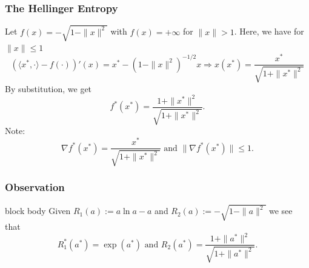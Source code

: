 \documentclass[aspectratio=169,xcolor=dvipsnames,11pt]{beamer}
\begin{document}
\begin{frame}\frametitle{The Hellinger Entropy}
\begin{example}
Let $f(x) = -\sqrt{1 - \|x\|^2}$ with $f(x) = +\infty$ for $\|x\| > 1$. Here, we have for $\|x\| \le 1$
\[ 
(\langle x^*, \cdot\rangle - f(\cdot))'(x) = x^* -  (1 - \|x\|^2)^{-1/2} x \Rightarrow x(x^*) = \frac{x^*}{\sqrt{1 + \|x^*\|^2}}
\]
By substitution, we get
\[
f^*(x^*) = \frac{1 + \|x^*\|^2}{\sqrt{1 + \|x^*\|^2}}.
\]
Note: 
\[
\nabla f^*(x^*) = \frac{x^*}{\sqrt{1 + \|x^*\|^2}} \text{ and } \| \nabla f^*(x^*) \| \le 1.
\]
\end{example}
\end{frame}

\begin{frame}\frametitle{Observation}
\begin{beamercolorbox}[rounded=true, shadow=true, wd=\textwidth]{block body}
Given $R_1(a) := a \ln a - a$ and $R_2(a) := -\sqrt{1 - \|a\|^2}$ we see that 
\[
R_1^*(a^*) = \exp(a^*) \text{ and } R_2(a^*) = \frac{1 + \|a^*\|^2}{\sqrt{1 + \|a^*\|^2}}.
\]

\vspace{-2ex}
\end{beamercolorbox}

\end{frame}
\end{document}
